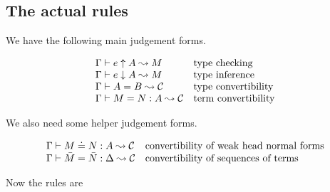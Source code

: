 


\subsection{The actual rules}

We have the following main judgement forms.

\[\begin{array}{ll}
    {\Gamma} \vdash {e} \uparrow {A} \leadsto {M} & \mbox{type checking} \\
    {\Gamma} \vdash {e} \downarrow {A} \leadsto {M} & \mbox{type inference} \\
    {\Gamma} \vdash {A} = {B} \leadsto {\mathcal{C}} & \mbox{type convertibility} \\
    {\Gamma} \vdash {M} = {N} : {A} \leadsto {\mathcal{C}} & \mbox{term convertibility} \\
\end{array}\]

We also need some helper judgement forms.

\[\begin{array}{ll}
    {\Gamma} \vdash {M} \doteq {N} : {A} \leadsto {\mathcal{C}} & \mbox{convertibility of weak head normal forms} \\
    {\Gamma} \vdash {\bar M} = {\bar N} : {\Delta} \leadsto {\mathcal{C}} & \mbox{convertibility of sequences of terms} \\
\end{array}\]

Now the rules are


